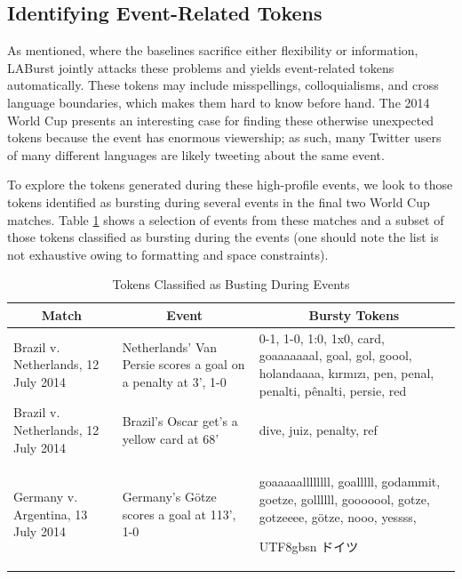 \documentclass[letterpaper]{article}
\newcommand{\myfont}{gbsn}
\begin{document}
\subsection{Identifying Event-Related Tokens}

As mentioned, where the baselines sacrifice either flexibility or information, LABurst jointly attacks these problems and yields event-related tokens automatically.
These tokens may include misspellings, colloquialisms, and cross language boundaries, which makes them hard to know before hand.
The 2014 World Cup presents an interesting case for finding these otherwise unexpected tokens because the event has enormous viewership; as such, many Twitter users of many different languages are likely tweeting about the same event.

To explore the tokens generated during these high-profile events, we look to those tokens identified as bursting during several events in the final two World Cup matches.
Table \ref{tab:burstyTokens} shows a selection of events from these matches and a subset of those tokens classified as bursting during the events (one should note the list is not exhaustive owing to formatting and space constraints).

\begin{table}[htdp]
\footnotesize
\caption{Tokens Classified as Busting During Events}
\begin{center}
\begin{tabular}{|p{0.75in}|p{0.7in}| p{1.45in} |}
\hline
\multicolumn{1}{|c|}{\textbf{Match}} & \multicolumn{1}{|c|}{\textbf{Event}} & \multicolumn{1}{|c|}{\textbf{Bursty Tokens}} \\ \hline
Brazil v. Netherlands, 12 July 2014 & Netherlands' Van Persie scores a goal on a penalty at 3', 1-0 & 0-1, 1-0, 1:0, 1x0, card, goaaaaaaal, goal, gol, goool, holandaaaa, k\i{}rm\i{}z\i{}, pen, penal, penalti, p\^{e}nalti, persie, red \\ \hline
Brazil v. Netherlands, 12 July 2014 & Brazil's Oscar get's a yellow card at 68' & dive, juiz, penalty, ref \\ \hline
Germany v. Argentina, 13 July 2014 & Germany's G\"{o}tze scores a goal at 113', 1-0 & goaaaaallllllll, goalllll, godammit, goetze, gollllll, gooooool, gotze, gotzeeee, g\"{o}tze, nooo, yessss, \begin{CJK}{UTF8}{\myfont} ドイツ\end{CJK} \\ \hline
\end{tabular}
\end{center}
\label{tab:burstyTokens}
\end{table}
\end{document}
